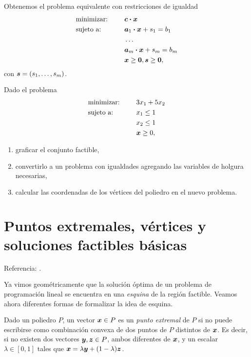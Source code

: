 Obtenemos el problema equivalente con restricciones de igualdad
\begin{alignat*}{2}
  & \text{minimizar: } & & \bm{c} \boldsymbol{\cdot} \bm{x} \\
   & \text{sujeto a: } & \quad & \bm{a}_1 \boldsymbol{\cdot} \bm{x} + s_1 = b_1 \\
   &  & \quad & \dots \\
   &  & \quad & \bm{a}_m \boldsymbol{\cdot} \bm{x} + s_m = b_m \\
   & & & \bm{x} \ge \bm{0}, \bm{s} \ge \bm{0},
\end{alignat*}
con $\bm{s} = (s_1, \dots, s_m)$.


\begin{ejercicio}
Dado el problema
\begin{alignat*}{2}
  & \text{minimizar: } & & 3 x_1 + 5 x_2 \\
   & \text{sujeto a: } & \quad & x_1 \le 1 \\
   & & & x_2 \le 1 \\
   & & & \bm{x} \ge 0,
\end{alignat*}
\begin{enumerate}
\item graficar el conjunto factible,
\item convertirlo a un problema con igualdades agregando las variables de holgura necesarias,
\item calcular las coordenadas de los vértices del poliedro en el nuevo problema.
\end{enumerate}
\end{ejercicio}


\section{Puntos extremales, vértices y soluciones factibles básicas}

\noindent Referencia: \cite[Sección 2.2]{Bertsimas1997}.

Ya vimos geométricamente que la solución óptima de un problema de programación lineal se encuentra en una \emph{esquina} de la región factible. Veamos ahora diferentes formas de formalizar la idea de esquina.

\begin{definition}
  Dado un poliedro $P$, un vector $\bm{x} \in P$ es un \emph{punto extremal} de $P$ si no puede escribirse como combinación convexa de dos puntos de $P$ distintos de $\bm{x}$. Es decir, si no existen dos vectores $\bm{y}, \bm{z} \in P$, ambos diferentes de $\bm{x}$, y un escalar $\lambda \in [0, 1]$ tales que $\bm{x} = \lambda \bm{y} + (1-\lambda) \bm{z}$.
\end{definition}


